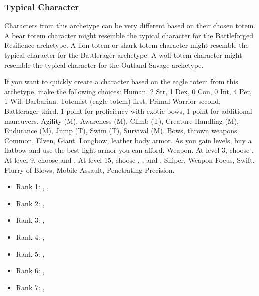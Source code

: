         \subsubsection{Typical Character}
            Characters from this archetype can be very different based on their chosen totem.
            A bear totem character might resemble the typical character for the Battleforged Resilience archetype.
            A lion totem or shark totem character might resemble the typical character for the Battlerager archetype.
            A wolf totem character might resemble the typical character for the Outland Savage archetype.

            If you want to quickly create a character based on the eagle totem from this archetype, make the following choices:
             Human.
             2 Str, 1 Dex, 0 Con, 0 Int, 4 Per, 1 Wil.
             Barbarian.
             Totemist (eagle totem) first, Primal Warrior second, Battlerager third.
             1 point for proficiency with exotic bows, 1 point for additional maneuvers.
             Agility (M), Awareness (M), Climb (T), Creature Handling (M), Endurance (M), Jump (T), Swim (T), Survival (M).
             Bows, thrown weapons.
             Common, Elven, Giant.
             Longbow, leather body armor. As you gain levels, buy a flatbow and use the best light armor you can afford.
             Weapon.
                At level 3, choose .
                At level 9, choose  and .
                At level 15, choose , , and .
             Sniper, Weapon Focus, Swift.
             Flurry of Blows, Mobile Assault, Penetrating Precision.
            \begin{itemize}
                \item Rank 1: , , 
                \item Rank 2: , 
                \item Rank 3: , 
                \item Rank 4: , 
                \item Rank 5: , 
                \item Rank 6: , 
                \item Rank 7: , 
            \end{itemize}

